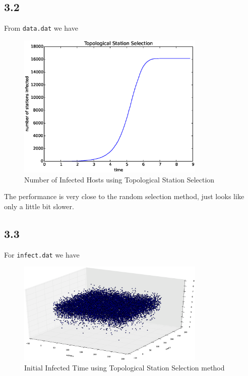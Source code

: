 \documentclass[10pt]{article}
\begin{document}
\subsection*{3.2}
From \texttt{data.dat} we have
\begin{figure}[H]
\begin{center}
\includegraphics[width=0.8\textwidth]{figure3.2.eps}
\caption{Number of Infected Hosts using Topological Station Selection}
\end{center}
\end{figure}

The performance is very close to the random selection method, just looks like only a little bit slower.

\subsection*{3.3}
For \texttt{infect.dat} we have

\begin{figure}[H]
\begin{center}
\includegraphics[width=0.8\textwidth]{figure2.3.eps}
\caption{Initial Infected Time using Topological Station Selection method}
\end{center}
\end{figure}
\end{document}
